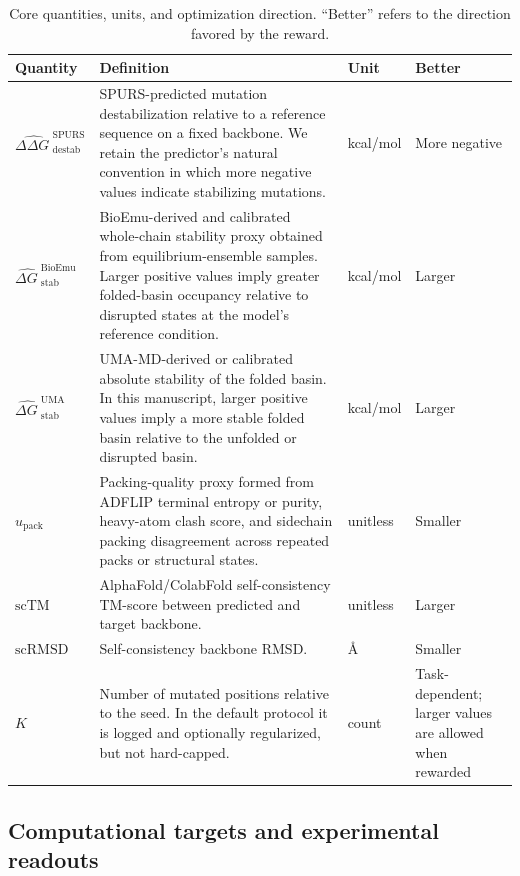 \documentclass[11pt]{article}
\newcommand{\packunc}{\ensuremath{u_{\mathrm{pack}}}}
\newcommand{\scTM}{\ensuremath{\mathrm{scTM}}}
\newcommand{\scRMSD}{\ensuremath{\mathrm{scRMSD}}}
\newcommand{\angstrom}{\ensuremath{\text{\AA}}}
\newcommand{\ddG}{\ensuremath{\Delta\Delta G \ }}
\newcommand{\dG}{\ensuremath{\Delta G \ }}
\begin{document}
\begin{table}[H]
\centering
\caption{Core quantities, units, and optimization direction. ``Better'' refers to the direction favored by the reward.}
\label{tab:signs}
\begin{tabularx}{\textwidth}{>{\raggedright\arraybackslash}p{} >{\raggedright\arraybackslash}p{} >{\raggedright\arraybackslash}p{} >{\raggedright\arraybackslash}X}
\toprule
Quantity & Definition & Unit & Better \\
\midrule
$\widehat{\ddG}^{\mathrm{SPURS}}_{\mathrm{destab}}$ & SPURS-predicted mutation destabilization relative to a reference sequence on a fixed backbone. We retain the predictor's natural convention in which more negative values indicate stabilizing mutations. & kcal/mol & More negative \\
$\widehat{\dG}^{\mathrm{BioEmu}}_{\mathrm{stab}}$ & BioEmu-derived and calibrated whole-chain stability proxy obtained from equilibrium-ensemble samples. Larger positive values imply greater folded-basin occupancy relative to disrupted states at the model's reference condition. & kcal/mol & Larger \\
$\widehat{\dG}^{\mathrm{UMA}}_{\mathrm{stab}}$ & UMA-MD-derived or calibrated absolute stability of the folded basin. In this manuscript, larger positive values imply a more stable folded basin relative to the unfolded or disrupted basin. & kcal/mol & Larger \\
$\packunc$ & Packing-quality proxy formed from ADFLIP terminal entropy or purity, heavy-atom clash score, and sidechain packing disagreement across repeated packs or structural states. & unitless & Smaller \\
$\scTM$ & AlphaFold/ColabFold self-consistency TM-score between predicted and target backbone. & unitless & Larger \\
$\scRMSD$ & Self-consistency backbone RMSD. & \angstrom & Smaller \\
$K$ & Number of mutated positions relative to the seed. In the default protocol it is logged and optionally regularized, but not hard-capped. & count & Task-dependent; larger values are allowed when rewarded \\
\bottomrule
\end{tabularx}
\end{table}

\subsection{Computational targets and experimental readouts}
\end{document}
